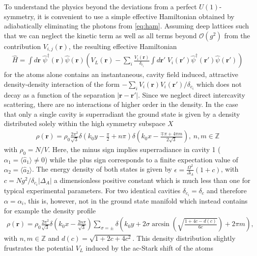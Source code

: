 \documentclass[12pt]{iopart}
\begin{document}
To understand the physics beyond the deviations from a perfect $U(1)$-symmetry, it is convenient to use 
a simple effective Hamiltonian obtained by adiabatically eliminating the photons from \eqref{eq:ham}.
Assuming deep lattices such that we can neglect the kinetic
term as well as all terms beyond $\mathcal{O}(g^2)$ from the contribution $V_{i,j}(\mathbf{r})$, the resulting effective Hamiltonian 
\begin{align}
\hat{H}=\int d\mathbf{r} \;\hat{\psi}^\dag(\mathbf{r})\hat{\psi}(\mathbf{r})\left(V_L(\mathbf{r})-\sum_i \frac{V_i(\mathbf{r})}{\delta_{c_i}}\int d\mathbf{r'}\; V_i(\mathbf{r'})\hat{\psi}^\dag(\mathbf{r'})\hat{\psi}(\mathbf{r'})\right)
\end{align}
for the atoms alone contains an instantaneous, cavity field induced, attractive density-density interaction of 
the form $-\sum_i V_i(\mathbf{r}) V_i(\mathbf{r'})/\delta_{c_i}$ which does not decay as a function of the separation $|\mathbf{r}-\mathbf{r'}|$. 
Since we neglect direct intercavity scattering, there are no interactions of higher order in the density.
In the case that only a single cavity is superradiant the ground state is given by a density distributed solely within the high symmetry subspace $X$
\begin{align}
\label{eq:densGS1}
\rho(\mathbf{r})=\rho_0\frac{2\pi^2}{\sqrt{3}}\delta\left(k_0 y-\frac{\pi}{2}+n\pi\right)\delta\left(k_0 x-\frac{\mp\pi+4\pi m}{2\sqrt{3}}\right),~n,m\in\mathbb{Z}
\end{align}
with $\rho_0=N/V$. Here, the minus sign implies superradiance in cavity 1 ($\alpha_1=\langle \hat{a}_1\rangle\neq0$) while the plus sign corresponds to a finite expectation value of $\alpha_2=\langle \hat{a}_2\rangle$. The energy density of both states is given by $\epsilon=\frac{\Omega^2}{\Delta_A}(1+c)$, with 
$c=N g^2/\delta_{c_i}|\Delta_A|$ a dimensionless positive constant  which is much less than one for typical experimental parameters. 
For two identical cavities $\delta_{c_i}=\delta_c$ and therefore $\alpha=\alpha_i$, this is, however, not in the ground state manifold which instead contains for example the density profile
\begin{align}
\label{eq:densGS2}
\rho(\mathbf{r})=\rho_0\frac{2\pi^2}{\sqrt{3}}\delta(k_0 x -\frac{2 n \pi}{\sqrt{3}})\sum_{\sigma=\pm}\delta\left(k_0 y +2\sigma \arcsin\left(\sqrt{\frac{1+4 c-d(c)}{6 c}}\right)+2\pi m\right),
\end{align}
with $n,m \in \mathbb{Z}$ and $d(c)=\sqrt{1+2 c+4c^2}$.
This density distribution slightly frustrates the potential $V_L$ induced by the ac-Stark shift of the atoms
\end{document}
